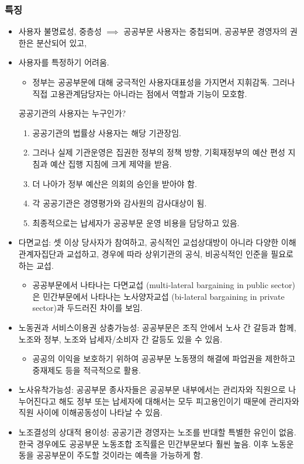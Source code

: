 \documentclass[aspectratio=169,xcolor=dvipsnames,handout]{beamer}
\begin{document}
\begin{frame}[allowframebreaks]
    \frametitle{특징}
    \begin{itemize}[<+->]
        \item 사용자 불명료성, 중층성 $\implies$ 공공부문 사용자는 중첩되며, 공공부문 경영자의 권한은 분산되어 있고, 
        \item 사용자를 특정하기 어려움. 
        \begin{itemize}
            \item 정부는 공공부문에 대해 궁극적인 사용자대표성을 가지면서 지휘감독. 그러나 직접 고용관계담당자는 아니라는 점에서 역할과 기능이 모호함. 
        \end{itemize}
        \begin{exampleblock}{공공기관의 사용자는 누구인가?}
            \begin{enumerate}[<+->]
                \item 공공기관의 법률상 사용자는 해당 기관장임.
                \item 그러나 실제 기관운영은 집권한 정부의 정책 방향, 기획재정부의 예산 편성 지침과 예산 집행 지침에 크게 제약을 받음.
                \item 더 나아가 정부 예산은 의회의 승인을 받아야 함.
                \item 각 공공기관은 경영평가와 감사원의 감사대상이 됨.
                \item 최종적으로는 납세자가 공공부문 운영 비용을 담당하고 있음. 
            \end{enumerate}
        \end{exampleblock}
        \item 다면교섭: 셋 이상 당사자가 참여하고, 공식적인 교섭상대방이 아니라 다양한 이해관계자집단과 교섭하고, 경우에 따라 상위기관의 공식, 비공식적인 인준을 필요로 하는 교섭. 
        \begin{itemize}
            \item 공공부문에서 나타나는 다면교섭 (multi-lateral bargaining in public sector)은 민간부문에서 나타나는 노사양자교섭 (bi-lateral bargaining in private sector)과 두드러진 차이를 보임.
        \end{itemize}
    \framebreak%
        \item 노동권과 서비스이용권 상충가능성: 공공부문은 조직 안에서 노사 간 갈등과 함께, 노조와 정부, 노조와 납세자/소비자 간 갈등도 있을 수 있음.  
        \begin{itemize}
            \item 공공의 이익을 보호하기 위하여 공공부문 노동쟁의 해결에 파업권을 제한하고 중재제도 등을 적극적으로 활용.
        \end{itemize}
        \item 노사유착가능성: 공공부문 종사자들은 공공부문 내부에서는 관리자와 직원으로 나누어진다고 해도 정부 또는 납세자에 대해서는 모두 피고용인이기 때문에 관리자와 직원 사이에 이해공동성이 나타날 수 있음.
        \item 노조결성의 상대적 용이성: 공공기관 경영자는 노조를 반대할 특별한 유인이 없음. 한국 경우에도 공공부문 노동조합 조직률은 민간부문보다 훨씬 높음. 이후 노동운동을 공공부문이 주도할 것이라는 예측을 가능하게 함.
    \end{itemize}
\end{frame}
\end{document}
